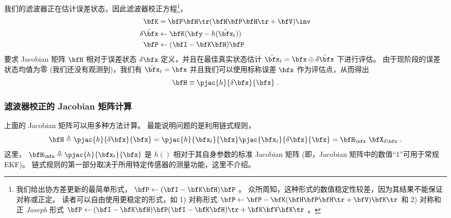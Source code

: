 我们的滤波器正在估计误差状态，因此滤波器校正方程\footnote{我们给出协方差更新的最简单形式， $\bfP \gets
 (\bfI-\bfK\bfH)\bfP$ 。 
众所周知，这种形式的数值稳定性较差，因为其结果不能保证对称或正定。 
读者可以自由使用更稳定的形式，如 1) 对称形式 $\bfP\gets\bfP-\bfK(\bfH\bfP\bfH\tr+\bfV)\bfK\tr$ 和 2) 对称和正 \emph{Joseph} 形式 $\bfP \gets (\bfI-\bfK\bfH)\bfP(\bfI-\bfK\bfH)\tr+\bfK\bfV\bfK\tr$ 。}，
%
%
\begin{align}
\bfK &= \bfP\bfH\tr(\bfH\bfP\bfH\tr+\bfV)\inv \\
\hat{\delta\bfx} &\gets \bfK(\bfy-h(\hat\bfx_t)) \\
\bfP &\gets (\bfI-\bfK\bfH)\bfP
\end{align}%
%
要求 Jacobian 矩阵 $\bfH$ 相对于误差状态 $\delta\bfx$ 定义，并且在最佳真实状态估计 $\hat\bfx_t=\bfx\oplus\hat{\delta\bfx}$ 下进行评估。
由于现阶段的误差状态均值为零 (我们还没有观测到)，我们有 $\hat\bfx_t = \bfx$ 并且我们可以使用标称误差 $\bfx$ 作为评估点，从而得出
%
\begin{equation}
\bfH \equiv \pjac{h}{\delta\bfx}{\bfx}~.
\end{equation}

\subsubsection{滤波器校正的 Jacobian 矩阵计算}

上面的 Jacobian 矩阵可以用多种方法计算。 
最能说明问题的是利用链式规则， 
%
\begin{equation}
\bfH \triangleq \pjac{h}{\delta\bfx}{\bfx} 
= \pjac{h}{\bfx_t}{\bfx}\pjac{\bfx_t}{\delta\bfx}{\bfx} = \bfH_\bfx\ \bfX_{\delta\bfx}~.
\end{equation}
%
这里， $\bfH_\bfx\triangleq\pjac{h}{\bfx_t}{\bfx}$ 是 $h()$ 相对于其自身参数的标准 Jacobian 矩阵 (即，Jacobian 矩阵中的数值``1''可用于常规 EKF)。
链式规则的第一部分取决于所用特定传感器的测量功能，这里不介绍。 

